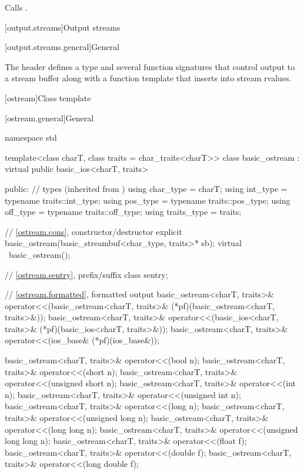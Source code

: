 \begin{itemdescr}
\pnum
\effects
Calls .
\end{itemdescr}


[output.streams]{Output streams}

[output.streams.general]{General}

\pnum
The header  defines a type
and several function signatures that control output to a
stream buffer along with a function template that inserts into stream rvalues.

[ostream]{Class template }

[ostream.general]{General}

%
\begin{codeblock}
namespace std {
  template<class charT, class traits = char_traits<charT>>
  class basic_ostream : virtual public basic_ios<charT, traits> {
  public:
    // types (inherited from )
    using char_type   = charT;
    using int_type    = typename traits::int_type;
    using pos_type    = typename traits::pos_type;
    using off_type    = typename traits::off_type;
    using traits_type = traits;

    // \ref{ostream.cons}, constructor/destructor
    explicit basic_ostream(basic_streambuf<char_type, traits>* sb);
    virtual ~basic_ostream();

    // \ref{ostream.sentry}, prefix/suffix
    class sentry;

    // \ref{ostream.formatted}, formatted output
    basic_ostream<charT, traits>&
      operator<<(basic_ostream<charT, traits>& (*pf)(basic_ostream<charT, traits>&));
    basic_ostream<charT, traits>&
      operator<<(basic_ios<charT, traits>& (*pf)(basic_ios<charT, traits>&));
    basic_ostream<charT, traits>&
      operator<<(ios_base& (*pf)(ios_base&));

    basic_ostream<charT, traits>& operator<<(bool n);
    basic_ostream<charT, traits>& operator<<(short n);
    basic_ostream<charT, traits>& operator<<(unsigned short n);
    basic_ostream<charT, traits>& operator<<(int n);
    basic_ostream<charT, traits>& operator<<(unsigned int n);
    basic_ostream<charT, traits>& operator<<(long n);
    basic_ostream<charT, traits>& operator<<(unsigned long n);
    basic_ostream<charT, traits>& operator<<(long long n);
    basic_ostream<charT, traits>& operator<<(unsigned long long n);
    basic_ostream<charT, traits>& operator<<(float f);
    basic_ostream<charT, traits>& operator<<(double f);
    basic_ostream<charT, traits>& operator<<(long double f);

}}
\end{codeblock}
